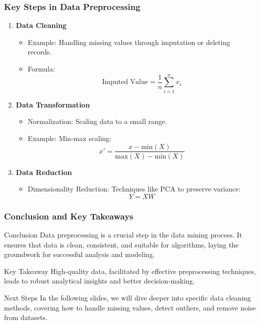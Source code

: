 \documentclass[aspectratio=169]{beamer}
\begin{document}
\begin{frame}[fragile]
    \frametitle{Key Steps in Data Preprocessing}
    \begin{enumerate}
        \item \textbf{Data Cleaning}
        \begin{itemize}
            \item Example: Handling missing values through imputation or deleting records.
            \item Formula:
            \begin{equation}
                \text{Imputed Value} = \frac{1}{n} \sum_{i=1}^{n} x_i
            \end{equation}
        \end{itemize}

        \item \textbf{Data Transformation}
        \begin{itemize}
            \item Normalization: Scaling data to a small range.
            \item Example: Min-max scaling:
            \begin{equation}
                x' = \frac{x - \text{min}(X)}{\text{max}(X) - \text{min}(X)}
            \end{equation}
        \end{itemize}

        \item \textbf{Data Reduction}
        \begin{itemize}
            \item Dimensionality Reduction: Techniques like PCA to preserve variance:
            \begin{equation}
                Y = XW
            \end{equation}
        \end{itemize}
    \end{enumerate}
\end{frame}

\begin{frame}[fragile]
    \frametitle{Conclusion and Key Takeaways}
    \begin{block}{Conclusion}
        Data preprocessing is a crucial step in the data mining process. It ensures that data is clean, consistent, and suitable for algorithms, laying the groundwork for successful analysis and modeling.
    \end{block}
    
    \begin{block}{Key Takeaway}
        High-quality data, facilitated by effective preprocessing techniques, leads to robust analytical insights and better decision-making.
    \end{block}

    \begin{block}{Next Steps}
        In the following slides, we will dive deeper into specific data cleaning methods, covering how to handle missing values, detect outliers, and remove noise from datasets.
    \end{block}
\end{frame}
\end{document}
